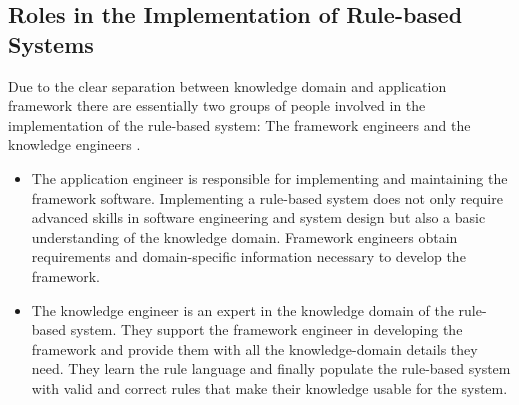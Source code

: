 \subsection{Roles in the Implementation of Rule-based Systems}\label{subsec:roles-in-the-implementation-of-rule-based-systems}
Due to the clear separation between knowledge domain and application framework there are essentially two groups of people
involved in the implementation of the rule-based system:
The framework engineers and the knowledge engineers \cite{jacob1990software}.
\begin{itemize}
    \item The application engineer is responsible for implementing and maintaining the framework software.
    Implementing a rule-based system does not only require advanced skills in software engineering and system design but also a basic understanding of the knowledge domain.
    Framework engineers obtain requirements and domain-specific information necessary to develop the framework.
    \item The knowledge engineer is an expert in the knowledge domain of the rule-based system.
    They support the framework engineer in developing the framework and provide them with all the knowledge-domain details they need.
    They learn the rule language and finally populate the rule-based system with valid and correct rules that make their knowledge usable for the system.
\end{itemize}
